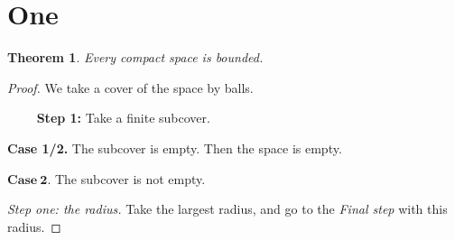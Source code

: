 \documentclass{article}
\newtheorem{thm}{Theorem}
\begin{document}
\section{One}
\begin{thm} Every compact space is bounded. \end{thm}
\begin{proof} We take a cover of the space by balls.

$\qquad$ {\bf Step 1:} Take a finite subcover.

\textbf{Case 1/2.} The subcover is empty. Then the space is empty.

$\mathbf{Case \ 2}.$ The subcover is not empty.

\textit{Step one: the radius.} Take the largest radius, and go to the
{\it Final step} with this radius.
\end{proof}
\end{document}

